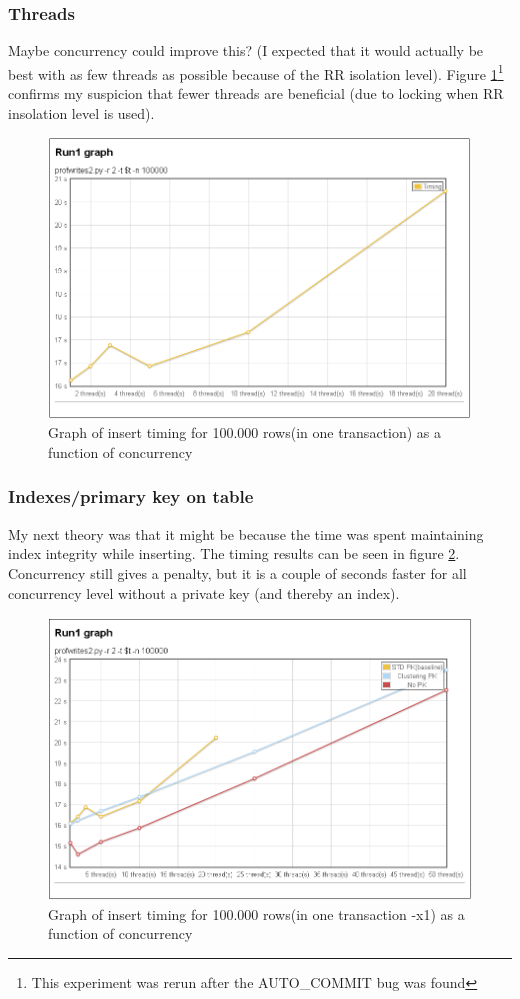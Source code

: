 \subsubsection{Threads}
Maybe concurrency could improve this?
(I expected that it would actually be best with as few threads as possible
because of the RR isolation level). Figure \ref{fig:part1athreads}\footnote{This
experiment was rerun after the AUTO\_COMMIT bug was found} confirms my
suspicion that fewer threads are beneficial (due to locking when RR insolation
level is used).
\begin{figure}
  \centering
  \includegraphics[width=12cm]{assignment2/run1}
  \caption[Insert performance]{Graph of insert timing for 100.000 rows(in one
  transaction) as a function of concurrency}\label{fig:part1athreads}
\end{figure}

\subsubsection{Indexes/primary key on table}
My next theory was that it might be because the time was spent maintaining index
integrity while inserting. The timing results can be seen in figure
\ref{fig:part1aindex1}. Concurrency still gives a penalty, but it is a couple of
seconds faster for all concurrency level without a private key (and thereby an
index).
\begin{figure}
  \centering
  \includegraphics[width=12cm]{assignment2/run1index}
  \caption[Insert performance]{Graph of insert timing for 100.000 rows(in one
  transaction -x1) as a function of concurrency}\label{fig:part1aindex1}
\end{figure}

